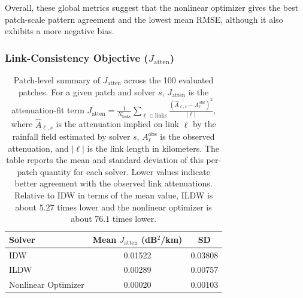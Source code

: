 \documentclass[11pt]{article}
\begin{document}

Overall, these global metrics suggest that the nonlinear optimizer gives the best patch-scale pattern agreement and the lowest mean RMSE, although it also exhibits a more negative bias.

\subsubsection{Link-Consistency Objective ($J_{\mathrm{atten}}$)}
\begin{table}[H]
  \centering
  \begin{tabular}{lcc}
    \toprule
    Solver & Mean $J_{\mathrm{atten}}$ (dB$^2$/km) & SD \\
    \midrule
    IDW & 0.01522 & 0.03808 \\
    ILDW & 0.00289 & 0.00757 \\
    Nonlinear Optimizer & 0.00020 & 0.00103 \\
    \bottomrule
  \end{tabular}
  \caption{Patch-level summary of $J_{\mathrm{atten}}$ across the 100 evaluated patches. For a given patch and solver $s$, $J_{\mathrm{atten}}$ is the attenuation-fit term $J_{\mathrm{atten}} = \frac{1}{N_{\mathrm{links}}}\sum_{\ell \in \mathrm{links}} \frac{\left(\hat{A}_{\ell,s} - A_\ell^{\mathrm{obs}}\right)^2}{|\ell|}$, where $\hat{A}_{\ell,s}$ is the attenuation implied on link $\ell$ by the rainfall field estimated by solver $s$, $A_\ell^{\mathrm{obs}}$ is the observed attenuation, and $|\ell|$ is the link length in kilometers. The table reports the mean and standard deviation of this per-patch quantity for each solver. Lower values indicate better agreement with the observed link attenuations. Relative to IDW in terms of the mean value, ILDW is about $5.27$ times lower and the nonlinear optimizer is about $76.1$ times lower.}
\end{table}
\end{document}
